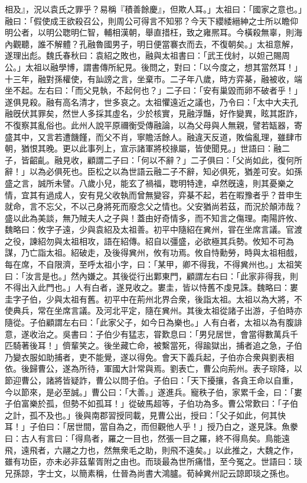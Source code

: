 \begin{pinyinscope}
相及』，況以袁氏之罪乎？易稱『積善餘慶』，但欺人耳。」太祖曰：「國家之意也。」融曰：「假使成王欲殺召公，則周公可得言不知邪？今天下纓緌縉紳之士所以瞻仰明公者，以明公聦明仁智，輔相漢朝，舉直措枉，致之雍熈耳。今橫殺無辜，則海內觀聽，誰不解體？孔融魯國男子，明日便當褰衣而去，不復朝矣。」太祖意解，遂理出彪。魏氏春秋曰：袁紹之敗也，融與太祖書曰：「武王伐紂，以妲己賜周公。」太祖以融學博，謂書傳所紀見。後問之，對曰：「以今度之，想其當然耳！」十三年，融對孫權使，有訕謗之言，坐棄市。二子年八歲，時方弈棊，融被收，端坐不起。左右曰：「而父見執，不起何也？」二子曰：「安有巢毀而卵不破者乎！」遂俱見殺。融有高名清才，世多哀之。太祖懼遠近之議也，乃令曰：「太中大夫孔融旣伏其罪矣，然世人多採其虛名，少於核實，見融浮豔，好作變異，眩其誑詐，不復察其亂俗也。此州人說平原禰衡受傳融論，以為父母與人無親，譬若缻器，寄盛其中，又言若遭饑饉，而父不肖，寧贍活餘人。融違天反道，敗倫亂理，雖肆市朝，猶恨其晚。更以此事列上，宣示諸軍將校掾屬，皆使聞見。」世語曰：融二子，皆齠齓。融見收，顧謂二子曰：「何以不辭？」二子俱曰：「父尚如此，復何所辭！」以為必俱死也。臣松之以為世語云融二子不辭，知必俱死，猶差可安。如孫盛之言，誠所未譬。八歲小兒，能玄了禍福，聦明特達，卓然旣遠，則其憂樂之情，宜其有過成人，安有見父收執而曾無變容，弈棊不起，若在暇豫者乎？昔申生就命，言不忘父，不以己身將死而廢念父之情也。父安猶尚若茲，而況於顛沛哉？盛以此為美談，無乃賊夫人之子與！蓋由好奇情多，而不知言之傷理。南陽許攸、魏略曰：攸字子遠，少與袁紹及太祖善。初平中隨紹在兾州，甞在坐席言議。官渡之役，諫紹勿與太祖相攻，語在紹傳。紹自以彊盛，必欲極其兵勢。攸知不可為謀，乃亡詣太祖。紹破走，及後得兾州，攸有功焉。攸自恃勳勞，時與太祖相戲，每在席，不自限濟，至呼太祖小字，曰：「某甲，卿不得我，不得兾州也。」太祖笑曰：「汝言是也。」然內嫌之。其後從行出鄴東門，顧謂左右曰：「此家非得我，則不得出入此門也。」人有白者，遂見收之。婁圭，皆以恃舊不虔見誅。魏略曰：婁圭字子伯，少與太祖有舊。初平中在荊州北界合衆，後詣太祖。太祖以為大將，不使典兵，常在坐席言議。及河北平定，隨在兾州。其後太祖從諸子出游，子伯時亦隨從。子伯顧謂左右曰：「此家父子，如今日為樂也。」人有白者，太祖以為有腹誹意，遂收治之。吳書曰：子伯少有猛志，甞歎息曰：「男兒居世，會當得數萬兵千匹騎著後耳！」儕輩笑之。後坐藏亡命，被繫當死，得踰獄出，捕者追之急，子伯乃變衣服如助捕者，吏不能覺，遂以得免。會天下義兵起，子伯亦合衆與劉表相依。後歸曹公，遂為所待，軍國大計常與焉。劉表亡，曹公向荊州。表子琮降，以節迎曹公，諸將皆疑詐，曹公以問子伯。子伯曰：「天下擾攘，各貪王命以自重，今以節來，是必至誠。」曹公曰：「大善。」遂進兵。寵秩子伯，家累千金，曰：「婁子伯富樂於孤，但勢不如孤耳！」從破馬超等，子伯功為多。曹公常歎曰：「子伯之計，孤不及也。」後與南郡習授同載，見曹公出，授曰：「父子如此，何其快耳！」子伯曰：「居世間，當自為之，而但觀他人乎！」授乃白之，遂見誅。魚豢曰：古人有言曰：「得鳥者，羅之一目也，然張一目之羅，終不得鳥矣。鳥能遠飛，遠飛者，六翮之力也，然無衆毛之助，則飛不遠矣。」以此推之，大魏之作，雖有功臣，亦未必非茲輩胥附之由也。而琰最為世所痛惜，至今冤之。世語曰：琰兄孫諒，字士文，以簡素稱，仕晉為尚書大鴻臚。荀綽兾州記云諒即琰之孫也。


\end{pinyinscope}